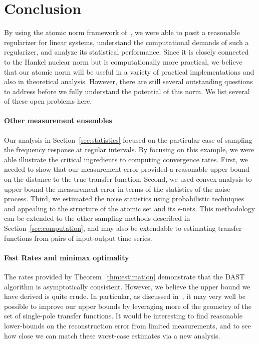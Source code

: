 \section{Conclusion}\label{sec:conclusion}

By using the atomic norm framework of~\cite{crpw}, we were able to posit a reasonable regularizer for linear systems, understand the computational demands of such a regularizer, and analyze its statistical performance.  Since it is closely connected to the Hankel nuclear norm but is computationally more practical, we believe that our atomic norm will be useful in a variety of practical implementations and also in theoretical analysis.  However, there are still several outstanding questions to address before we fully understand the potential of this norm.  We list several of these open problems here.

\paragraph{Other measurement ensembles} Our analysis in Section~\ref{sec:statistics} focused on the particular case of sampling the frequency response at regular intervals.  By focusing on this example, we were able illustrate the critical ingredients to computing convergence rates.  First, we needed to show that our measurement error provided a reasonable upper bound on the distance to the true transfer function.  Second, we used convex analysis to upper bound the measurement error in terms of the statistics of the noise process.  Third, we estimated the noise statistics using probabilistic techniques and appealing to the structure of the atomic set and its $\epsilon$-nets.  This methodology can be extended to the other sampling methods described in Section~\ref{sec:computation}, and may also be extendable to estimating transfer functions from pairs of input-output time series.

\paragraph{Fast Rates and minimax optimality}  The rates provided by Theorem~\ref{thm:estimation} demonstrate that the DAST algorithm is asymptotically consistent.  However, we believe the upper bound we have derived is quite crude.  In particular, as discussed in~\cite{BhaskarAllerton11}, it may very well be possible to improve our upper bounds by leveraging more of the geometry of the set of single-pole transfer functions.  It would be interesting to find reasonable lower-bounds on the reconstruction error from limited measurements, and to see how close we can match these worst-case estimates via a new analysis.

